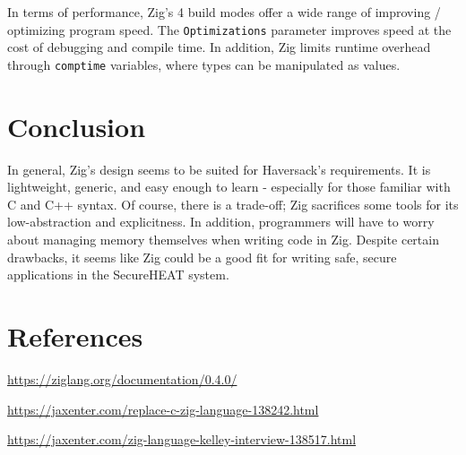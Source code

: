 In terms of performance, Zig's 4 build modes offer a wide range of improving / optimizing program speed. The \verb +Optimizations+ parameter improves speed at the cost of debugging and compile time. In addition, Zig limits runtime overhead through \verb +comptime+ variables, where types can be manipulated as values. 
 

\section{Conclusion}

In general, Zig's design seems to be suited for Haversack's requirements. It is lightweight, generic, and easy enough to learn - especially for those familiar with C and C++ syntax. Of course, there is a trade-off; Zig sacrifices some tools for its low-abstraction and explicitness. In addition, programmers will have to worry about managing memory themselves when writing code in Zig. Despite certain drawbacks, it seems like Zig could be a good fit for writing safe, secure applications in the SecureHEAT system. 

\section{References}
\url{https://ziglang.org/documentation/0.4.0/}

\url {https://jaxenter.com/replace-c-zig-language-138242.html}

\url {https://jaxenter.com/zig-language-kelley-interview-138517.html}









